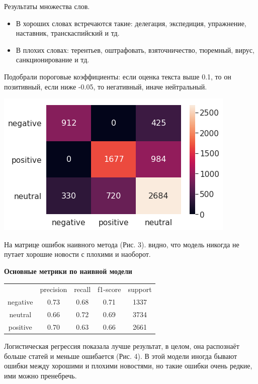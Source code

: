\documentclass[12pt]{article}
\begin{document}
        Результаты множества слов.
        \begin{itemize}
            \item В хороших словах встречаются такие: делегация, экспедиция, упражнение, наставник, транскаспийский и тд.
            \item В плохих словах: терентьев, оштрафовать, взяточничество, тюремный, вирус, санкционирование и тд.
        \end{itemize}
        
        Подобрали пороговые коэффициенты: если оценка текста выше 0.1, то он позитивный,
        если ниже -0.05, то негативный, иначе нейтральный.

        \begin{center}
            \includegraphics[scale=0.8]{naive_heat}
        \end{center}

        На матрице ошибок наивного метода (Рис. 3). видно, что модель никогда не путает хорошие новости
        с плохими и наоборот.

        \textbf{Основные метрики по наивной модели}
        \begin{center}
            \begin{tabular}{ c c c c c}
             & precision & recall & f1-score & support\\ 
             negative & 0.73 & 0.68 & 0.71 & 1337\\ 
             neutral & 0.66 & 0.72 & 0.69 & 3734\\
             positive & 0.70 & 0.63 & 0.66 & 2661
            \end{tabular}
        \end{center}

        Логистическая регрессия показала лучше результат, в целом, она распознаёт больше
        статей и меньше ошибается (Рис. 4). В этой модели иногда бывают ошибки между хорошими и плохими 
        новостями, но такие ошибки очень редкие, ими можно пренебречь.
\end{document}
